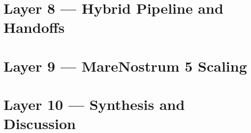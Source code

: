 \documentclass[11pt]{report}
\begin{document}
\chapter{Layer 8 --- Hybrid Pipeline and Handoffs}
\label{ch:layer8}


\chapter{Layer 9 --- MareNostrum 5 Scaling}
\label{ch:layer9}


\chapter{Layer 10 --- Synthesis and Discussion}
\label{ch:layer10}


\appendix

%
%
%
%
%
%
%
%
%
%
%
%
%
%
%
%
%



\end{document}
